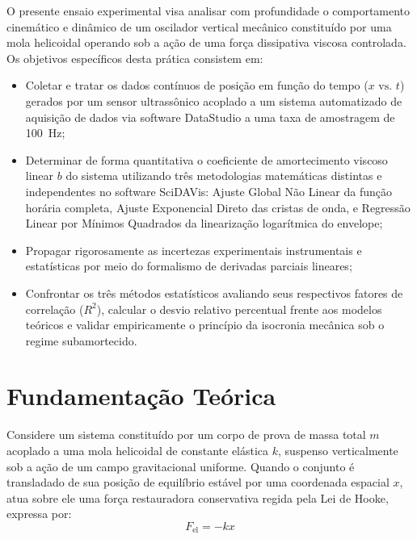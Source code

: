 \documentclass[12pt, a4paper]{article}
\begin{document}
O presente ensaio experimental visa analisar com profundidade o comportamento cinemático e dinâmico de um oscilador vertical mecânico constituído por uma mola helicoidal operando sob a ação de uma força dissipativa viscosa controlada. Os objetivos específicos desta prática consistem em:
\begin{itemize}
    \item Coletar e tratar os dados contínuos de posição em função do tempo ($x \text{ vs. } t$) gerados por um sensor ultrassônico acoplado a um sistema automatizado de aquisição de dados via software DataStudio a uma taxa de amostragem de \SI{100}{\hertz};
    \item Determinar de forma quantitativa o coeficiente de amortecimento viscoso linear $b$ do sistema utilizando três metodologias matemáticas distintas e independentes no software SciDAVis: Ajuste Global Não Linear da função horária completa, Ajuste Exponencial Direto das cristas de onda, e Regressão Linear por Mínimos Quadrados da linearização logarítmica do envelope;
    \item Propagar rigorosamente as incertezas experimentais instrumentais e estatísticas por meio do formalismo de derivadas parciais lineares;
    \item Confrontar os três métodos estatísticos avaliando seus respectivos fatores de correlação ($R^2$), calcular o desvio relativo percentual frente aos modelos teóricos e validar empiricamente o princípio da isocronia mecânica sob o regime subamortecido.
\end{itemize}

\section{Fundamentação Teórica}

Considere um sistema constituído por um corpo de prova de massa total $m$ acoplado a uma mola helicoidal de constante elástica $k$, suspenso verticalmente sob a ação de um campo gravitacional uniforme. Quando o conjunto é transladado de sua posição de equilíbrio estável por uma coordenada espacial $x$, atua sobre ele uma força restauradora conservativa regida pela Lei de Hooke, expressa por:
\begin{equation}
    F_{\text{el}} = -kx
\end{equation}
\end{document}
